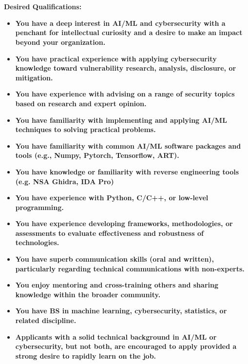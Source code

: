 \\\\
\textbf{Desired Qualifications:}
\begin{itemize}
    \item \textbf{You have a deep interest in AI/ML and cybersecurity with a penchant for intellectual curiosity and a desire to make an impact beyond your organization.}
    \item \textbf{You have practical experience with applying cybersecurity knowledge toward vulnerability research, analysis, disclosure, or mitigation. }
    \item \textbf{You have experience with advising on a range of security topics based on research and expert opinion. }
    \item \textbf{You have familiarity with implementing and applying AI/ML techniques to solving practical problems. }
    \item \textbf{You have familiarity with common AI/ML software packages and tools (e.g., Numpy, Pytorch, Tensorflow, ART). }
    \item \textbf{You have knowledge or familiarity with reverse engineering tools (e.g. NSA Ghidra, IDA Pro) }
    \item \textbf{You have experience with Python, C/C++, or low-level programming. }
    \item \textbf{You have experience developing frameworks, methodologies, or assessments to evaluate effectiveness and robustness of technologies. }
    \item \textbf{You have superb communication skills (oral and written), particularly regarding technical communications with non-experts. }
    \item \textbf{You enjoy mentoring and cross-training others and sharing knowledge within the broader community. }
    \item \textbf{You have BS in machine learning, cybersecurity, statistics, or related discipline.}
    \item \textbf{Applicants with a solid technical background in AI/ML or cybersecurity, but not both, are encouraged to apply provided a strong desire to rapidly learn on the job. }

\end{itemize}